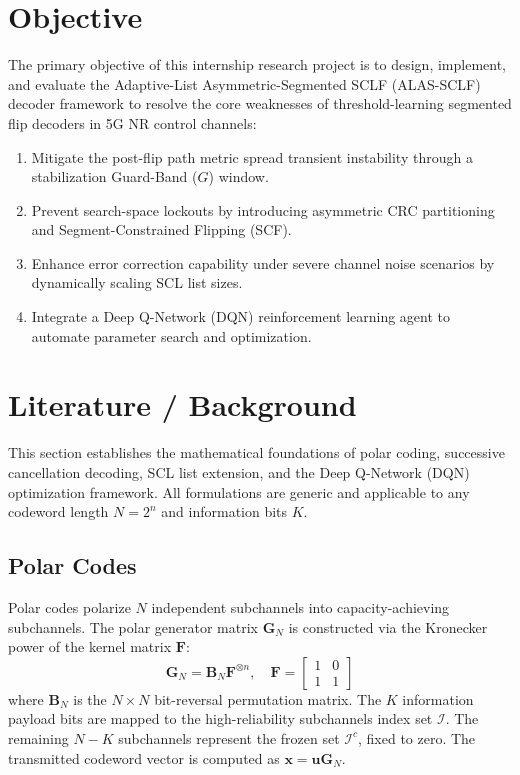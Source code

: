\documentclass[journal,10pt,twocolumn]{IEEEtran}
\begin{document}
\section{Objective}
The primary objective of this internship research project is to design, implement, and evaluate the Adaptive-List Asymmetric-Segmented SCLF (ALAS-SCLF) decoder framework to resolve the core weaknesses of threshold-learning segmented flip decoders in 5G NR control channels:
\begin{enumerate}
    \item Mitigate the post-flip path metric spread transient instability through a stabilization Guard-Band ($G$) window.
    \item Prevent search-space lockouts by introducing asymmetric CRC partitioning and Segment-Constrained Flipping (SCF).
    \item Enhance error correction capability under severe channel noise scenarios by dynamically scaling SCL list sizes.
    \item Integrate a Deep Q-Network (DQN) reinforcement learning agent to automate parameter search and optimization.
\end{enumerate}

\section{Literature / Background}
This section establishes the mathematical foundations of polar coding, successive cancellation decoding, SCL list extension, and the Deep Q-Network (DQN) optimization framework. All formulations are generic and applicable to any codeword length $N = 2^n$ and information bits $K$.

\subsection{Polar Codes}
Polar codes polarize $N$ independent subchannels into capacity-achieving subchannels. The polar generator matrix $\mathbf{G}_N$ is constructed via the Kronecker power of the kernel matrix $\mathbf{F}$:
\begin{equation}
\mathbf{G}_N = \mathbf{B}_N \mathbf{F}^{\otimes n}, \quad \mathbf{F} = \begin{bmatrix} 1 & 0 \\ 1 & 1 \end{bmatrix}
\end{equation}
where $\mathbf{B}_N$ is the $N \times N$ bit-reversal permutation matrix. The $K$ information payload bits are mapped to the high-reliability subchannels index set $\mathcal{I}$. The remaining $N - K$ subchannels represent the frozen set $\mathcal{I}^c$, fixed to zero. The transmitted codeword vector is computed as $\mathbf{x} = \mathbf{u} \mathbf{G}_N$.
\end{document}
